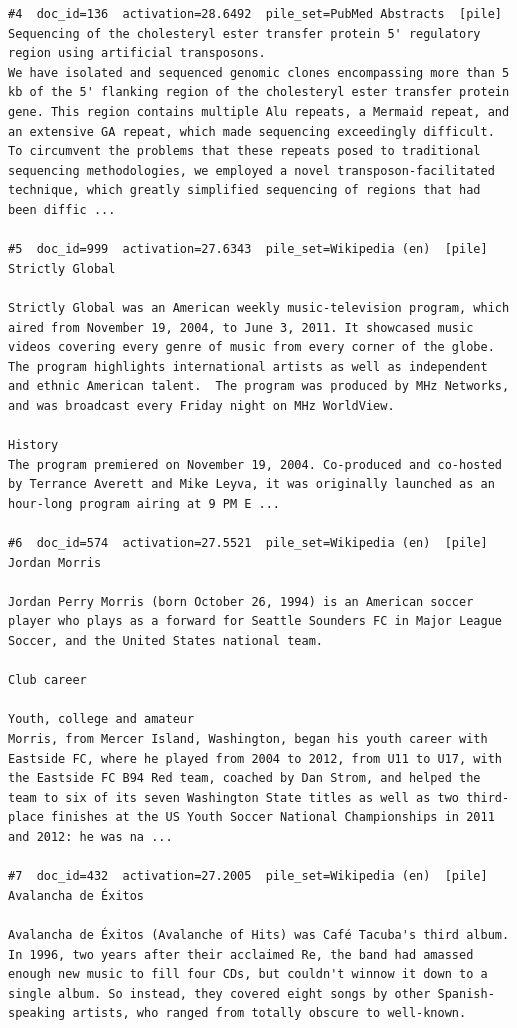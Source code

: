 \begin{verbatim}
#4  doc_id=136  activation=28.6492  pile_set=PubMed Abstracts  [pile]
Sequencing of the cholesteryl ester transfer protein 5' regulatory region using artificial transposons.
We have isolated and sequenced genomic clones encompassing more than 5 kb of the 5' flanking region of the cholesteryl ester transfer protein gene. This region contains multiple Alu repeats, a Mermaid repeat, and an extensive GA repeat, which made sequencing exceedingly difficult. To circumvent the problems that these repeats posed to traditional sequencing methodologies, we employed a novel transposon-facilitated technique, which greatly simplified sequencing of regions that had been diffic ...

#5  doc_id=999  activation=27.6343  pile_set=Wikipedia (en)  [pile]
Strictly Global

Strictly Global was an American weekly music-television program, which aired from November 19, 2004, to June 3, 2011. It showcased music videos covering every genre of music from every corner of the globe. The program highlights international artists as well as independent and ethnic American talent.  The program was produced by MHz Networks, and was broadcast every Friday night on MHz WorldView.

History 
The program premiered on November 19, 2004. Co-produced and co-hosted by Terrance Averett and Mike Leyva, it was originally launched as an hour-long program airing at 9 PM E ...

#6  doc_id=574  activation=27.5521  pile_set=Wikipedia (en)  [pile]
Jordan Morris

Jordan Perry Morris (born October 26, 1994) is an American soccer player who plays as a forward for Seattle Sounders FC in Major League Soccer, and the United States national team.

Club career

Youth, college and amateur
Morris, from Mercer Island, Washington, began his youth career with Eastside FC, where he played from 2004 to 2012, from U11 to U17, with the Eastside FC B94 Red team, coached by Dan Strom, and helped the team to six of its seven Washington State titles as well as two third-place finishes at the US Youth Soccer National Championships in 2011 and 2012: he was na ...

#7  doc_id=432  activation=27.2005  pile_set=Wikipedia (en)  [pile]
Avalancha de Éxitos

Avalancha de Éxitos (Avalanche of Hits) was Café Tacuba's third album. In 1996, two years after their acclaimed Re, the band had amassed enough new music to fill four CDs, but couldn't winnow it down to a single album. So instead, they covered eight songs by other Spanish-speaking artists, who ranged from totally obscure to well-known.


\end{verbatim}
